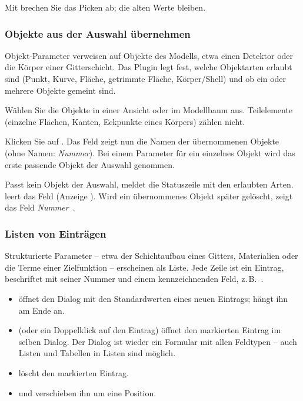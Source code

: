 Mit  brechen Sie das Picken ab; die alten Werte bleiben.

\subsubsection{Objekte aus der Auswahl übernehmen}\label{sec:plugin-objekt}

Objekt-Parameter verweisen auf Objekte des Modells, etwa einen Detektor oder die Körper einer
Gitterschicht. Das Plugin legt fest, welche Objektarten erlaubt sind (Punkt, Kurve, Fläche,
getrimmte Fläche, Körper/Shell) und ob ein oder mehrere Objekte gemeint sind.

\begin{schritte}
  \item Wählen Sie die Objekte in einer Ansicht oder im Modellbaum aus. Teilelemente (einzelne
        Flächen, Kanten, Eckpunkte eines Körpers) zählen nicht.
  \item Klicken Sie auf . Das Feld zeigt nun die Namen der übernommenen
        Objekte (ohne Namen: \code{\#}\textit{Nummer}). Bei einem Parameter für ein einzelnes
        Objekt wird das erste passende Objekt der Auswahl genommen.
\end{schritte}

Passt kein Objekt der Auswahl, meldet die Statuszeile
 mit den erlaubten Arten. \gui{$\times$} leert das
Feld (Anzeige \gui{---}). Wird ein übernommenes Objekt später gelöscht, zeigt das Feld
\code{\#}\textit{Nummer}~.

\subsubsection{Listen von Einträgen}\label{sec:plugin-liste}

Strukturierte Parameter – etwa der Schichtaufbau eines Gitters, Materialien oder die Terme einer
Zielfunktion – erscheinen als Liste. Jede Zeile ist ein Eintrag, beschriftet mit seiner Nummer
und einem kennzeichnenden Feld, z.\,B.\ .

\begin{itemize}
  \item {} öffnet den Dialog  mit den Standardwerten eines neuen
        Eintrags;  hängt ihn am Ende an.
  \item {} (oder ein Doppelklick auf den Eintrag) öffnet den markierten Eintrag im
        selben Dialog. Der Dialog ist wieder ein Formular mit allen Feldtypen – auch Listen
        und Tabellen in Listen sind möglich.
  \item {} löscht den markierten Eintrag.
  \item \gui{$\uparrow$} und \gui{$\downarrow$} verschieben ihn um eine Position.
\end{itemize}

